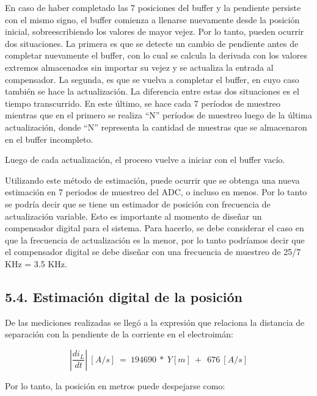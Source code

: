 \documentclass{article} %
\begin{document}
\noindent 

\noindent En caso de haber completado las 7 posiciones del buffer y la pendiente persiste con el mismo signo, el buffer comienza a llenarse nuevamente desde la posici\'{o}n inicial, sobreescribiendo los valores de mayor vejez. Por lo tanto, pueden ocurrir dos situaciones. La primera es que se detecte un cambio de pendiente antes de completar nuevamente el buffer, con lo cual se calcula la derivada con los valores extremos almacenados sin importar su vejez y se actualiza la entrada al compensador. La segunda, es que se vuelva a completar el buffer, en cuyo caso tambi\'{e}n se hace la actualizaci\'{o}n. La diferencia entre estas dos situaciones es el tiempo transcurrido. En este \'{u}ltimo, se hace cada 7 per\'{i}odos de muestreo mientras que en el primero se realiza ``N'' per\'{i}odos de muestreo luego de la \'{u}ltima actualizaci\'{o}n, donde ``N'' representa la cantidad de muestras que se almacenaron en el buffer incompleto.

\noindent 

\noindent Luego de cada actualizaci\'{o}n, el proceso vuelve a iniciar con el buffer vac\'{i}o.

\noindent 

\noindent Utilizando este m\'{e}todo de estimaci\'{o}n, puede ocurrir que se obtenga una nueva estimaci\'{o}n en 7 periodos de muestreo del ADC, o incluso en menos. Por lo tanto se podr\'{i}a decir que se tiene un estimador de posici\'{o}n con frecuencia de actualizaci\'{o}n variable. Esto es importante al momento de dise\~{n}ar un compensador digital para el sistema. Para hacerlo, se debe considerar el caso en que la frecuencia de actualizaci\'{o}n es la menor, por lo tanto podr\'{i}amos decir que el compensador digital se debe dise\~{n}ar con una frecuencia de muestreo de 25/7 KHz = 3.5 KHz.

\noindent 
\subsection{5.4. Estimaci\'{o}n digital de la posici\'{o}n}

\noindent De las mediciones realizadas se lleg\'{o} a la expresi\'{o}n que relaciona la distancia de separaci\'{o}n con la pendiente de la corriente en el electroim\'{a}n:

\noindent 
\[\left|\frac{{di}_L}{dt}\right|\ [A/s]\ =\ 194690\ *\ Y[m]\ +\ \ 676\ [A/s]\] 


\noindent Por lo tanto, la posici\'{o}n en metros puede despejarse como$:$
\end{document}
